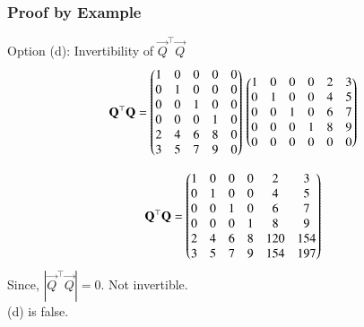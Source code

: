 \documentclass{beamer}
\begin{document}
\begin{frame}[fragile]
    \frametitle{Proof by Example}
Option (d): Invertibility of $\vec{Q}^\top\vec{Q}$\\
\begin{equation}
\mathbf{Q}^\top\mathbf{Q}
=
\begin{pmatrix}
1&0&0&0&0\\
0&1&0&0&0\\
0&0&1&0&0\\
0&0&0&1&0\\
2&4&6&8&0\\
3&5&7&9&0
\end{pmatrix}
\,
\begin{pmatrix}
1&0&0&0&2&3\\
0&1&0&0&4&5\\
0&0&1&0&6&7\\
0&0&0&1&8&9\\
0&0&0&0&0&0
\end{pmatrix}
\end{equation}

\begin{equation}
    \mathbf{Q}^\top\mathbf{Q}=
\begin{pmatrix}
1&0&0&0&2&3\\
0&1&0&0&4&5\\
0&0&1&0&6&7\\
0&0&0&1&8&9\\
2&4&6&8&120&154\\
3&5&7&9&154&197
\end{pmatrix}
\end{equation}
Since, $|\vec{Q}^\top\vec{Q}|=0$. Not invertible.\\ 
(d) is false.
\end{frame}
\end{document}
